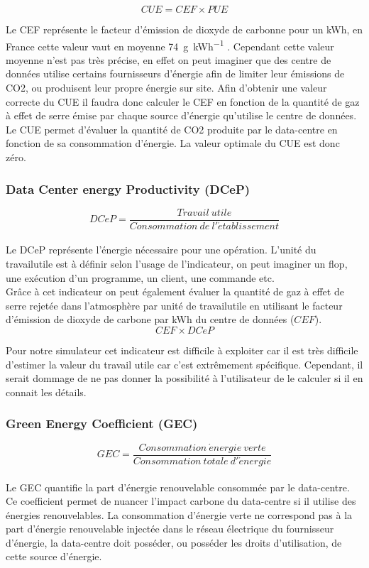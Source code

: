 \[CUE=CEF \times PUE\]

Le CEF représente le facteur d'émission de dioxyde de carbonne pour un kWh, en France cette valeur vaut en moyenne \SI[per-mode = symbol]{74}{\g\per\kWh} \cite{co2PerkWh}. Cependant cette valeur moyenne n'est pas très précise, en effet on peut imaginer que des centre de données utilise certains fournisseurs d'énergie afin de limiter leur émissions de CO2, ou produisent leur propre énergie sur site. Afin d'obtenir une valeur correcte du CUE il faudra donc calculer le CEF en fonction de la quantité de gaz à effet de serre émise par chaque source d'énergie qu'utilise le centre de données.\\

Le CUE permet d'évaluer la quantité de CO2 produite par le data-centre en fonction de sa consommation d'énergie. La valeur optimale du CUE est donc zéro.

\subsubsection{Data Center energy Productivity (DCeP)}
\[DCeP=\frac{Travail\ utile}{Consommation\ de\  l'\acute{e}tablissement}\]\\
Le DCeP représente l'énergie nécessaire pour une opération. L'unité du \gls{travailutile} est à définir selon l'usage de l'indicateur, on peut imaginer un \gls{flop}, une exécution d'un programme, un client, une commande etc.\\

Grâce à cet indicateur on peut également évaluer la quantité de gaz à effet de serre rejetée dans l'atmosphère par unité de \gls{travailutile} en utilisant le facteur d'émission de dioxyde de carbone par kWh du centre de données ($CEF$).
\[CEF \times DCeP\]

Pour notre simulateur cet indicateur est difficile à exploiter car il est très difficile d'estimer la valeur du travail utile car c'est extrêmement spécifique. Cependant, il serait dommage de ne pas donner la possibilité à l'utilisateur de le calculer si il en connait les détails.

\subsubsection{Green Energy Coefficient (GEC)}
\[GEC=\frac{Consommation\ \acute{e}nergie\ verte}{Consommation\ totale\ d'\acute{e}nergie}\]\\
Le GEC quantifie la part d'énergie renouvelable consommée par le data-centre. Ce coefficient permet de nuancer l'impact carbone du data-centre si il utilise des énergies renouvelables.
La consommation d'énergie verte ne correspond pas à la part d'énergie renouvelable injectée dans le réseau électrique du fournisseur d'énergie, la data-centre doit posséder, ou posséder les droits d'utilisation, de cette source d'énergie.

